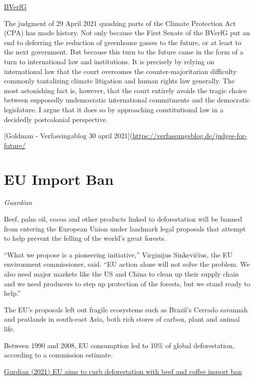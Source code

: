 \documentclass[
]{book}
\begin{document}
\href{https://www.bundesverfassungsgericht.de/SharedDocs/Pressemitteilungen/EN/2021/bvg21-031.html}{BVerfG}

The judgment of 29 April 2021 quashing parts of the Climate Protection Act (CPA) has made history. Not only because the First Senate of the BVerfG put an end to deferring the reduction of greenhouse gasses to the future, or at least to the next government. But because this turn to the future came in the form of a turn to international law and institutions. It is precisely by relying on international law that the court overcomes the counter-majoritarian difficulty commonly tantalizing climate litigation and human rights law generally. The most astonishing fact is, however, that the court entirely avoids the tragic choice between supposedly undemocratic international commitments and the democratic legislature. I argue that it does so by approaching constitutional law in a decidedly postcolonial perspective.

{[}Goldman - Verfassingablog 30 april 2021{]}(\url{https://verfassungsblog.de/judges-for-future/}

\hypertarget{eu-import-ban}{%
\section{EU Import Ban}\label{eu-import-ban}}

\emph{Guardian}

Beef, palm oil, cocoa and other products linked to deforestation will be banned from entering the European Union under landmark legal proposals that attempt to help prevent the felling of the world's great forests.

``What we propose is a pioneering initiative,'' Virginijus Sinkevičius, the EU environment commissioner, said. ``EU action alone will not solve the problem. We also need major markets like the US and China to clean up their supply chain and we need producers to step up protection of the forests, but we stand ready to help.''

The EU's proposals left out fragile ecosystems such as Brazil's Cerrado savannah and peatlands in south-east Asia, both rich stores of carbon, plant and animal life.

Between 1990 and 2008, EU consumption led to 10\% of global deforestation, according to a commission estimate.

\href{https://www.theguardian.com/environment/2021/nov/17/eu-deforestation-beef-coffee-import-ban-commodities-endangered-forests}{Gurdian (2021) EU aims to curb deforestation with beef and coffee import ban}
\end{document}

